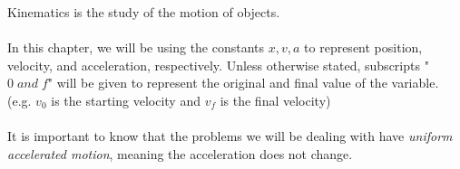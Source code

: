 Kinematics is the study of the motion of objects.
\\\\
In this chapter, we will be using the constants $x, v, a$ to represent position, velocity, and acceleration, respectively.  Unless otherwise stated, subscripts "$0 \; and \; f$" will be given to represent the original and final value of the variable. (e.g. $v_0$ is the starting velocity and $v_f$ is the final velocity)
\\\\
It is important to know that the problems we will be dealing with have \emph{uniform accelerated motion}, meaning the acceleration does not change.